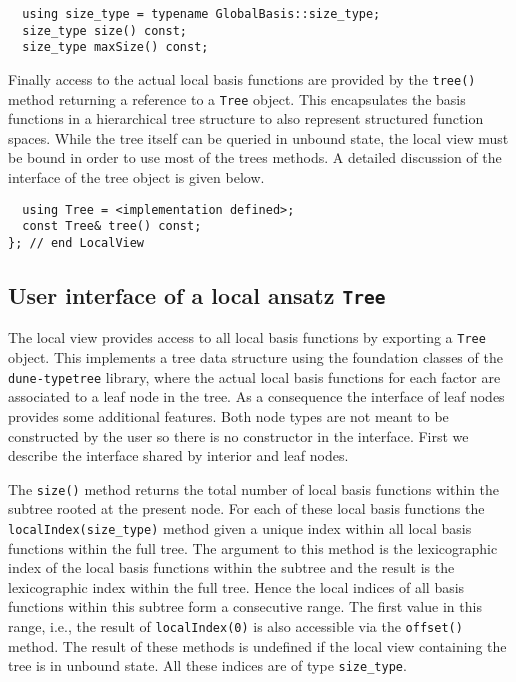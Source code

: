 \documentclass[a4paper,10pt,headings=normal,bibliography=totoc]{scrartcl}
\newcommand{\dunemodule}[1]{\texttt{#1}}
\begin{document}
\begin{lstlisting}
  using size_type = typename GlobalBasis::size_type;
  size_type size() const;
  size_type maxSize() const;
\end{lstlisting}

Finally access to the actual local basis functions are provided
by the \texttt{tree()} method returning a reference to a
\texttt{Tree} object. This encapsulates the basis functions
in a hierarchical tree structure to also represent structured
function spaces.
While the tree  itself can be queried in unbound state,
the local view must be bound in order to use most of the
trees methods.
A detailed discussion of the interface of the tree object is
given below.

\begin{lstlisting}
  using Tree = <implementation defined>;
  const Tree& tree() const;
}; // end LocalView
\end{lstlisting}

\subsection{User interface of a local ansatz \texttt{Tree}}
The local view provides access to all local basis functions
by exporting a \texttt{Tree} object. This implements a tree
data structure using the foundation classes of the
\dunemodule{dune-typetree} library, where the actual local basis
functions for each factor are associated to a leaf node
in the tree. As a consequence the interface of leaf nodes
provides some additional features.
Both node types are not meant to be constructed by the
user so there is no constructor in the interface.
First we describe the interface shared by interior
and leaf nodes.

The \texttt{size()} method returns the total number of
local basis functions within the subtree rooted at the
present node. For each of these local basis functions the
\texttt{localIndex(size\_type)} method given a unique
index within all local basis functions within the full
tree. The argument to this method is the lexicographic
index of the local basis functions within the subtree
and the result is the lexicographic index within the full
tree. Hence the local indices of all basis functions
within this subtree form a consecutive range. The first
value in this range, i.e., the result of \texttt{localIndex(0)}
is also accessible via the \texttt{offset()} method.
The result of these methods is undefined if the
local view containing the tree is in unbound state.
All these indices are of type \texttt{size\_type}.
\end{document}
